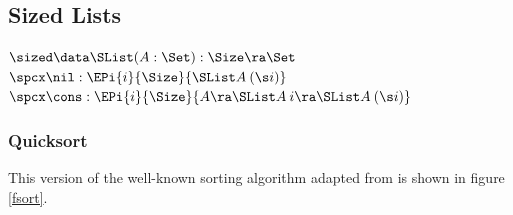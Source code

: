 \clearpage

\subsection{Sized Lists}
\begin{bsp}
$\sized \data \SList ( A : \Set ) : \Size \ra \Set $ \\
$\spcx \nil : \EPi{i}{\Size}{ \SList A \: (\s i)} $\\
$\spcx \cons : \EPi{i}{\Size}{ A \ra \SList A \: i \ra \SList A \: (\s i)} $
\end{bsp}

\subsubsection{Quicksort}
This version of the well-known sorting algorithm adapted from \cite{abel:rairo04} is shown in figure \ref{fsort}.

